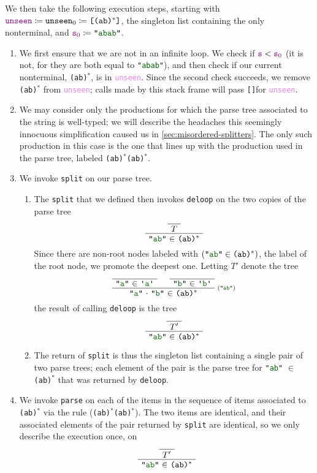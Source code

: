 \documentclass[preprint]{sigplanconf}
\newcommand{\str}[1]{\texttt{"\textcolor{DarkGreen}{#1}"}}
\newcommand{\regex}[1]{\texttt{#1}}
\newcommand{\terminal}[1]{\texttt{\textquotesingle\textcolor{DarkGreen}{#1}\textquotesingle}}
\newcommand{\fname}[1]{\texttt{#1}}
\newcommand{\farg}[1]{\textcolor{violet}{\texttt{#1}}}
\newcommand{\nil}{\texttt{[]}}
\newcommand{\defeq}{\coloneqq}
\newcommand{\llstrcat}[2]{#1 \ensuremath{\cdot} #2}
\newcommand{\valuelist}[1]{\texttt{[}#1\texttt{]}}
\begin{document}
    We then take the following execution steps, starting with $\farg{unseen} \defeq \fname{unseen$_0$} \defeq \valuelist{\regex{(ab)$^*$}}$, the singleton list containing the only nonterminal, and $\farg{s$_0$} \defeq \str{abab}$.
    \begin{enumerate}
      \item
        We first ensure that we are not in an infinite loop.  We check if $\farg{s} < \farg{s$_0$}$ (it is not, for they are both equal to \str{abab}), and then check if our current nonterminal, \regex{(ab)$^*$}, is in \farg{unseen}.  Since the second check succeeds, we remove \regex{(ab)$^*$} from \farg{unseen}; calls made by this stack frame will pass \nil\space for \farg{unseen}.
      \item
        We may consider only the productions for which the parse tree associated to the string is well-typed; we will describe the headaches this seemingly innocuous simplification caused us in \autoref{sec:misordered-splitters}.  The only such production in this case is the one that lines up with the production used in the parse tree, labeled \regex{(ab)$^*$(ab)$^*$}.
      \item
        We invoke \fname{split} on our parse tree.
        \begin{enumerate}
          \item
            The \fname{split} that we defined then invokes \fname{deloop} on the two copies of the parse tree
            \[
              \AxiomC{}
              \UnaryInfC{$T$}
              \UnaryInfC{\str{ab} $\in$ \regex{(ab)$^*$}}
            \DisplayProof
            \]
            Since there are non-root nodes labeled with $(\str{ab}\in\regex{(ab)$^*$})$, the label of the root node, we promote the deepest one.  Letting $T'$ denote the tree
            \[
              \AxiomC{}\UnaryInfC{\str{a} $\in$ \terminal{a}}
              \AxiomC{}\UnaryInfC{\str{b} $\in$ \terminal{b}}
              \RightLabel{\scriptsize(\str{ab})}
              \BinaryInfC{\llstrcat{\str{a}}{\str{b}} $\in$ \regex{(ab)$^*$}}
            \DisplayProof
            \]
            the result of calling \fname{deloop} is the tree
            \[
              \AxiomC{}
              \UnaryInfC{$T'$}
              \UnaryInfC{\str{ab} $\in$ \regex{(ab)$^*$}}
            \DisplayProof
            \]

          \item The return of \fname{split} is thus the singleton list containing a single pair of two parse trees; each element of the pair is the parse tree for \str{ab} $\in$ \regex{(ab)$^*$} that was returned by \fname{deloop}.
        \end{enumerate}
      \item
        We invoke \fname{parse} on each of the items in the sequence of items associated to \regex{(ab)$^*$} via the rule (\regex{(ab)$^*$(ab)$^*$}).  The two items are identical, and their associated elements of the pair returned by \fname{split} are identical, so we only describe the execution once, on
        \[
          \AxiomC{}
          \UnaryInfC{$T'$}
          \UnaryInfC{\str{ab} $\in$ \regex{(ab)$^*$}}
        \DisplayProof
        \]


\end{enumerate}
\end{document}
